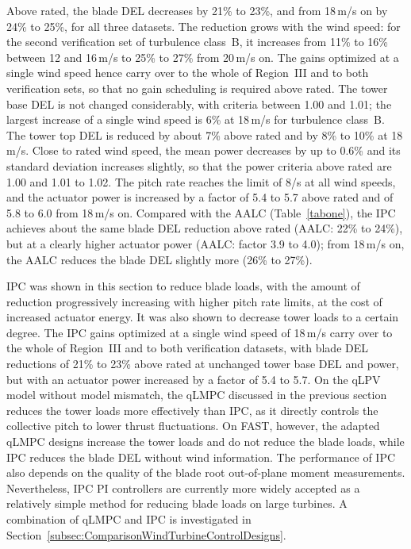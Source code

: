 Above rated, the blade DEL decreases by 21\% to 23\%, and from 18\,m/s on by 24\% to 25\%, for all three datasets. The reduction grows with the wind speed: for the second verification set of turbulence class~B, it increases from 11\% to 16\% between 12 and 16\,m/s to 25\% to 27\% from 20\,m/s on. The gains optimized at a single wind speed hence carry over to the whole of Region~III and to both verification sets, so that no gain scheduling is required above rated. The tower base DEL is not changed considerably, with criteria between 1.00 and 1.01; the largest increase of a single wind speed is 6\% at 18\,m/s for turbulence class~B. The tower top DEL is reduced by about 7\% above rated and by 8\% to 10\% at 18\,m/s. Close to rated wind speed, the mean power decreases by up to 0.6\% and its standard deviation increases slightly, so that the power criteria above rated are 1.00 and 1.01 to 1.02. The pitch rate reaches the limit of 8\textdegree/s at all wind speeds, and the actuator power is increased by a factor of 5.4 to 5.7 above rated and of 5.8 to 6.0 from 18\,m/s on. Compared with the AALC (Table~\ref{tabone}), the IPC achieves about the same blade DEL reduction above rated (AALC: 22\% to 24\%), but at a clearly higher actuator power (AALC: factor 3.9 to 4.0); from 18\,m/s on, the AALC reduces the blade DEL slightly more (26\% to 27\%).


IPC was shown in this section to reduce blade loads, with the amount of reduction progressively increasing with higher pitch rate limits, at the cost of increased actuator energy. It was also shown to decrease tower loads to a certain degree. The IPC gains optimized at a single wind speed of 18\,m/s carry over to the whole of Region~III and to both verification datasets, with blade DEL reductions of 21\% to 23\% above rated at unchanged tower base DEL and power, but with an actuator power increased by a factor of 5.4 to 5.7. 
On the qLPV model without model mismatch, the qLMPC discussed in the previous section reduces the tower loads more effectively than IPC, as it directly controls the collective pitch to lower thrust fluctuations. On FAST, however, the adapted qLMPC designs increase the tower loads and do not reduce the blade loads, while IPC reduces the blade DEL without wind information. The performance of IPC also depends on the quality of the blade root out-of-plane moment measurements. Nevertheless, IPC PI controllers are currently more widely accepted as a relatively simple method for reducing blade loads on large turbines. A combination of qLMPC and IPC is investigated in Section~\ref{subsec:ComparisonWindTurbineControlDesigns}.

